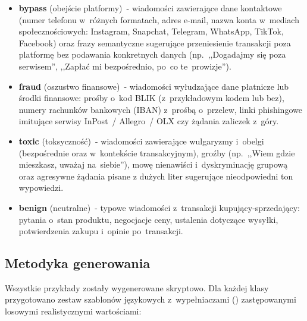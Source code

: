 \begin{itemize}
  \item \textbf{bypass} (obejście platformy)~- wiadomości zawierające dane
    kontaktowe (numer telefonu w~różnych formatach, adres e-mail, nazwa konta
    w~mediach społecznościowych: Instagram, Snapchat, Telegram, WhatsApp,
    TikTok, Facebook) oraz frazy semantyczne sugerujące przeniesienie
    transakcji poza platformę bez podawania konkretnych danych
    (np.\ ,,Dogadajmy się poza serwisem'', ,,Zapłać mi bezpośrednio, po~co
    te~prowizje'').

  \item \textbf{fraud} (oszustwo finansowe)~- wiadomości wyłudzające dane
    płatnicze lub środki finansowe: prośby o~kod BLIK (z~przykładowym kodem
    lub bez), numery rachunków bankowych (IBAN) z~prośbą o~przelew, linki
    phishingowe imitujące serwisy InPost~/ Allegro~/ OLX czy żądania zaliczek
    z~góry.

  \item \textbf{toxic} (toksyczność)~- wiadomości zawierające wulgaryzmy
    i~obelgi (bezpośrednie oraz w~kontekście transakcyjnym), groźby
    (np.\ ,,Wiem gdzie mieszkasz, uważaj na~siebie''), mowę nienawiści
    i~dyskryminację grupową oraz agresywne żądania pisane z dużych liter sugerujące nieodpowiedni ton wypowiedzi.

  \item \textbf{benign} (neutralne)~- typowe wiadomości z~transakcji
    kupujący-sprzedający: pytania o~stan produktu, negocjacje ceny,
    ustalenia dotyczące wysyłki, potwierdzenia zakupu i~opinie po~transakcji.
\end{itemize}

\subsection{Metodyka generowania}
\label{sec:dataset-generowanie}

Wszystkie przykłady zostały wygenerowane skryptowo.
Dla każdej klasy przygotowano zestaw szablonów językowych z~wypełniaczami
() zastępowanymi losowymi realistycznymi wartościami:

